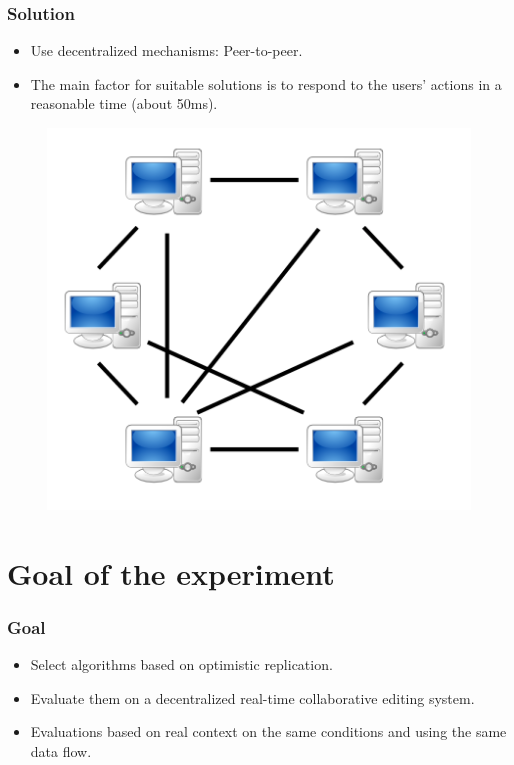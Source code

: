 \documentclass[14pt]{beamer}
\begin{document}
	\begin{frame}
		\frametitle{Solution}
		\begin{itemize}
			\item Use decentralized mechanisms: Peer-to-peer.
			\item The main factor for suitable solutions is to respond to the users' actions in a reasonable time (about 50ms). 
		\end{itemize}
		\begin{figure}
			\includegraphics[scale=0.3]{includes/p2p.png}
	   	\end{figure}
	\end{frame}
	
\section{Goal of the experiment}
	\begin{frame}
		\frametitle{Goal}
		\begin{itemize}
			\item Select algorithms based on optimistic replication.
			\item Evaluate them on a decentralized real-time collaborative editing system.
			\item Evaluations based on real context on the same conditions and using the same data flow.
		\end{itemize}
	\end{frame}
	
\end{document}
